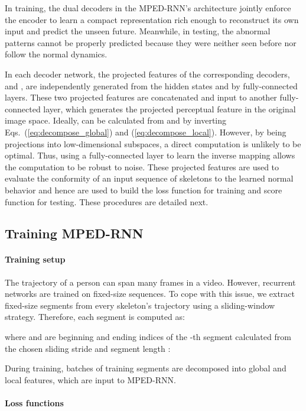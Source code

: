 In training, the dual decoders in the MPED-RNN's architecture jointly
enforce the encoder to learn a compact representation rich enough
to reconstruct its own input and predict the unseen future. Meanwhile,
in testing, the abnormal patterns cannot be properly predicted because
they were neither seen before nor follow the normal dynamics.

In each decoder network, the projected features of the corresponding
decoders,  and , are independently
generated from the hidden states  and  by
fully-connected layers. These two projected features are concatenated
and input to another fully-connected layer, which generates the projected
perceptual feature  in the original image space. Ideally,
 can be calculated from  and 
by inverting Eqs.~(\ref{eq:decompose_global}) and (\ref{eq:decompose_local}).
However, by being projections into low-dimensional subspaces, a direct
computation is unlikely to be optimal. Thus, using a fully-connected
layer to learn the inverse mapping allows the computation to be robust
to noise. These projected features are used to evaluate the conformity
of an input sequence of skeletons to the learned normal behavior and
hence are used to build the loss function for training and score function
for testing. These procedures are detailed next.

\subsection{Training MPED-RNN\label{subsec:Training-MPED-RNN}}

\paragraph*{Training setup}

The trajectory of a person can span many frames in a video. However,
recurrent networks are trained on fixed-size sequences. To cope with
this issue, we extract fixed-size segments from every skeleton's trajectory
using a sliding-window strategy. Therefore, each segment is computed
as:

where  and  are beginning and ending indices of the
-th segment calculated from the chosen sliding stride  and
segment length :


During training, batches of training segments are decomposed into
global and local features, which are input to MPED-RNN. 

\paragraph*{Loss functions}

